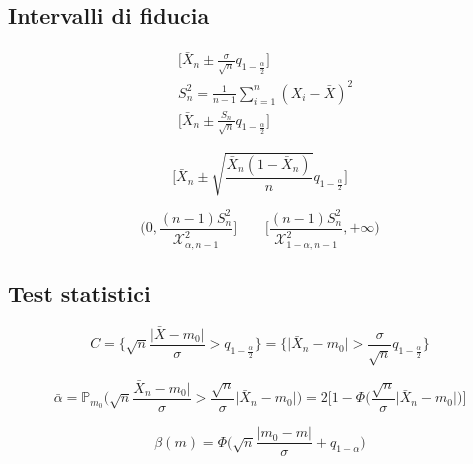 \subsection{Intervalli di fiducia}
\begin{definition}
	\begin{align}
		& \bigg[\bar{X}_n \pm \frac{\sigma}{\sqrt{n}}q_{1-\frac{\alpha}{2}}\bigg]\\
		& S_n^2 = \frac{1}{n-1}\sum_{i=1}^{n}(X_i - \bar{X})^2 \\
		& \bigg[\bar{X}_n \pm \frac{S_n}{\sqrt{n}}q_{1-\frac{\alpha}{2}}\bigg]
	\end{align}
\end{definition}
\begin{definition}
	\begin{equation}
		\bigg[\bar{X}_n \pm \sqrt{\frac{\bar{X}_n(1-\bar{X}_n)}{n}} q_{1-\frac{\alpha}{2}}\bigg]
	\end{equation}
\end{definition}
\begin{definition}
	\begin{equation}
		\bigg( 0,\frac{(n-1)S^2_n}{\mathcal{X}^2_{\alpha, n-1}} \bigg] \quad\quad \bigg[ \frac{(n-1)S^2_n}{\mathcal{X}^2_{1-\alpha, n-1}}, +\infty \bigg)
	\end{equation}
\end{definition}

\subsection{Test statistici}
\begin{definition}\newcommand{\eqname}[1]{\tag*{#1}}%
	\begin{equation}
		C = \bigg\{\sqrt{n}\frac{\lvert \bar{X} - m_0 \rvert}{\sigma} > q_{1-\frac{\alpha}{2}}\bigg\} = \bigg\{\lvert \bar{X}_n - m_0 \rvert > \frac{\sigma}{\sqrt{n}}q_{1-\frac{\alpha}{2}}\bigg\}
	\end{equation}
\end{definition}
\begin{definition}[p-value]
	\begin{equation}
		\bar{\alpha} = \mathbb{P}_{m_0}\bigg( \sqrt{n}\frac{\bar{X}_n - m_0 \rvert}{\sigma} > \frac{\sqrt{n}}{\sigma}\lvert\bar{X}_n - m_0 \rvert\bigg) = 2 \bigg[1- \Phi\bigg(\frac{\sqrt{n}}{\sigma}\lvert\bar{X}_n - m_0 \rvert\bigg)\bigg]
	\end{equation}
\end{definition}
\begin{definition}
	\begin{equation}
		\beta(m)= \Phi\bigg(\sqrt{n}\frac{\lvert m_0 - m \rvert}{\sigma}+q_{1-\alpha}\bigg)
	\end{equation}
\end{definition}
